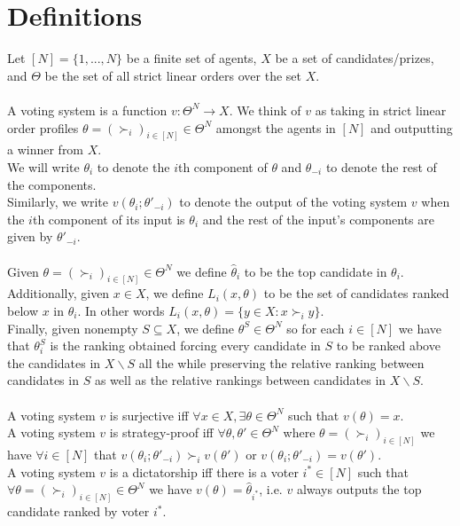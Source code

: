 \documentclass[11pt]{article}
\title{}
\date{}
\theoremstyle{definition}
\theoremstyle{plain}
\begin{document}
\section{Definitions}
Let $[N]=\{1,...,N\}$ be a finite set of agents, $X$ be a set of candidates/prizes,
and $\Theta$ be the set of all strict linear orders over the set $X$.
\\
\\
A voting system is a function $v: \Theta^N \to X$. We think of $v$ as taking in
strict linear order profiles $\theta=(\succ_i)_{i \in [N]} \in \Theta^N$ amongst
the agents in $[N]$ and outputting a winner from $X$.
\\
We will write $\theta_i$ to denote the $i$th component of $\theta$ and $\theta_{-i}
$ to denote the rest of the components.
\\
Similarly, we write $v(\theta_i;\theta'_{-i})$ to denote the output of the voting
system $v$ when the $i$th component of its input is $\theta_i$ and the rest of the
input's components are given by $\theta'_{-i}$.
\\
\\
Given $\theta=(\succ_i)_{i \in [N]} \in \Theta^N$ we define $\hat{\theta}_i$ to be
the top candidate in $\theta_i$.
\\
Additionally, given $x \in X$, we define $L_i(x,\theta)$ to be the set of
candidates ranked below $x$ in $\theta_i$. In other words $L_i(x,\theta)=\{y \in
X : x \succ_i y\}$.
\\
Finally, given nonempty $S \subseteq X$, we define $\theta^{S} \in \Theta^N$ so for each $i
\in [N]$ we have that $\theta^S_i$ is the ranking obtained forcing every candidate
in $S$ to be ranked above the candidates in $X \backslash S$ all the while
preserving the relative ranking between candidates in $S$ as well as the relative
rankings between candidates in $X \backslash S$.
\\
\\
A voting system $v$ is surjective iff $\forall x \in X, \exists \theta \in
\Theta^N$ such that $v(\theta)=x$.
\\
A voting system $v$ is strategy-proof iff $\forall \theta,\theta' \in \Theta^N$
where $\theta=(\succ_i)_{i \in[N]}$ we have $\forall i \in [N]$ that $v(\theta_i;
\theta'_{-i}) \succ_i v(\theta')$ or $v(\theta_i; \theta'_{-i}) = v(\theta')$.
\\
A voting system $v$ is a dictatorship iff there is a voter $i^* \in [N]$ such that
$\forall \theta=(\succ_i)_{i \in [N]} \in \Theta^N$ we have $v(\theta)=\hat{\theta}
_{i^*}$, i.e. $v$ always outputs the top candidate ranked by voter $i^*$.
\end{document}
